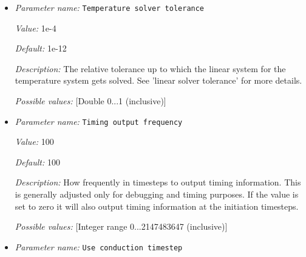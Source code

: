 \begin{itemize}
{\it Value:} 0


{\it Default:} 0


{\it Description:} The mathematical equations that describe thermal convection only determine the pressure up to an arbitrary constant. On the other hand, for comparison and for looking up material parameters it is important that the pressure be normalized somehow. We do this by enforcing a particular average pressure value at the surface of the domain, where the geometry model determines where the surface is. This parameter describes what this average surface pressure value is supposed to be. By default, it is set to zero, but one may want to choose a different value for example for simulating only the volume of the mantle below the lithosphere, in which case the surface pressure should be the lithostatic pressure at the bottom of the lithosphere.

For more information, see the section in the manual that discusses the general mathematical model.


{\it Possible values:} [Double -1.79769e+308...1.79769e+308 (inclusive)]
\item {\it Parameter name:} {\tt Temperature solver tolerance}
\label{parameters:Temperature solver tolerance}


{\it Value:} 1e-4


{\it Default:} 1e-12


{\it Description:} The relative tolerance up to which the linear system for the temperature system gets solved. See 'linear solver tolerance' for more details.


{\it Possible values:} [Double 0...1 (inclusive)]
\item {\it Parameter name:} {\tt Timing output frequency}
\label{parameters:Timing output frequency}


{\it Value:} 100


{\it Default:} 100


{\it Description:} How frequently in timesteps to output timing information. This is generally adjusted only for debugging and timing purposes. If the value is set to zero it will also output timing information at the initiation timesteps.


{\it Possible values:} [Integer range 0...2147483647 (inclusive)]
\item {\it Parameter name:} {\tt Use conduction timestep}
\label{parameters:Use conduction timestep}



\end{itemize}
